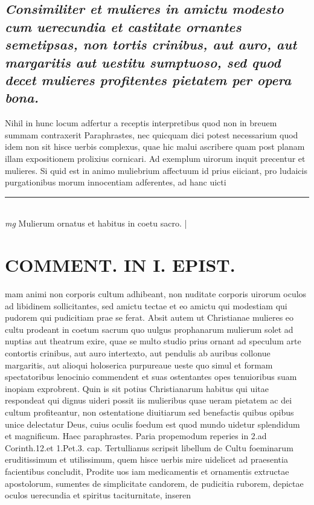 \documentclass{article}
\begin{document}
\begin{pages}
\subsection*{\textit{Consimiliter et mulieres in amictu modesto cum uerecundia et castitate ornantes semetipsas, non tortis crinibus, aut auro, aut margaritis aut uestitu sumptuoso, sed quod decet mulieres profitentes pietatem per opera bona. }}\pstart Nihil in hunc locum adfertur a receptis interpretibus quod non in breuem summam contraxerit Paraphrastes, nec quicquam dici potest necessarium quod idem non sit hisce uerbis complexus, quae hic malui ascribere quam post planam illam expositionem prolixius cornicari. Ad exemplum uirorum inquit precentur et mulieres. Si quid est in animo muliebrium affectuum id prius eiiciant, pro ludaicis purgationibus morum innocentiam adferentes, ad hanc uicti\pend
\vspace{0.5cm}\noindent
\vspace{0.2cm}\rule{1cm}{0.2pt}\\ 
\hspace{0.2cm}\textit{mg}
\footnotesize Mulierum ornatus et habitus in coetu sacro. 
\normalsize| 
\section*{COMMENT. IN I. EPIST. }\pstart mam animi non corporis cultum adhibeant, non nuditate corporis uirorum oculos ad libidinem sollicitantes, sed amictu tectae et eo amictu qui modestiam qui pudorem qui pudicitiam prae se ferat. Absit autem ut Christianae mulieres eo cultu prodeant in coetum sacrum quo uulgus prophanarum mulierum solet ad nuptias aut theatrum exire, quae se multo studio prius ornant ad speculum arte contortis crinibus, aut auro intertexto, aut pendulis ab auribus collonue margaritis, aut alioqui holoserica purpureaue ueste quo simul et formam spectatoribus lenocinio commendent et suas ostentantes opes tenuioribus suam inopiam exprobrent. Quin is sit potius Christianarum habitus qui uitae respondeat qui dignus uideri possit iis mulieribus quae ueram pietatem ac dei cultum profiteantur, non ostentatione diuitiarum sed benefactis quibus opibus unice delectatur Deus, cuius oculis foedum est quod mundo uidetur splendidum et magnificum. Haec paraphrastes. Paria propemodum reperies in 2.ad Corinth.12.et 1.Pet.3. cap. Tertullianus scripsit libellum de Cultu foeminarum eruditissimum et utilissimum, quem hisce uerbis mire uidelicet ad praesentia facientibus concludit, Prodite uos iam medicamentis et ornamentis extructae apostolorum, sumentes de simplicitate candorem, de pudicitia ruborem, depictae oculos uerecundia et spiritus taciturnitate, inseren\pend

\end{pages}
\end{document}
